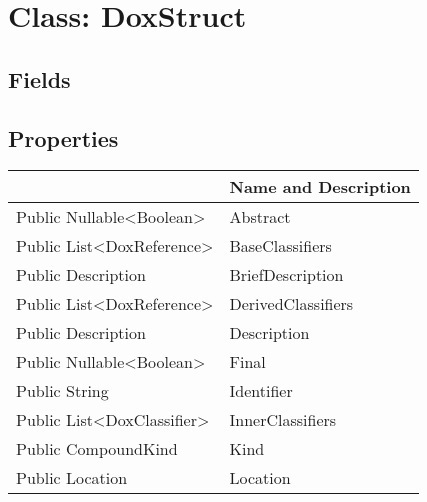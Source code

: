 \documentclass[11pt, oneside, a4paper]{book}
\begin{document}
\hypertarget{SoftwareEngineeringTools.{}Documentation.{}DoxStruct}{}
\section{Class: DoxStruct}

\subsection{Fields}

\subsection{Properties}
\begin{center}
\begin{tabular}{| p{3cm} | p{12cm} | }
\hline
\textbf{ } & \textbf{ Name and Description}\\
\hline
 Public  Nullable<Boolean> &  Abstract\hypertarget{SoftwareEngineeringTools.{}Documentation.{}DoxStruct.{}Abstract}{}\\
\hline
 Public  List<DoxReference> &  BaseClassifiers\hypertarget{SoftwareEngineeringTools.{}Documentation.{}DoxStruct.{}BaseClassifiers}{}\\
\hline
 Public  Description &  BriefDescription\hypertarget{SoftwareEngineeringTools.{}Documentation.{}DoxStruct.{}BriefDescription}{}\\
\hline
 Public  List<DoxReference> &  DerivedClassifiers\hypertarget{SoftwareEngineeringTools.{}Documentation.{}DoxStruct.{}DerivedClassifiers}{}\\
\hline
 Public  Description &  Description\hypertarget{SoftwareEngineeringTools.{}Documentation.{}DoxStruct.{}Description}{}\\
\hline
 Public  Nullable<Boolean> &  Final\hypertarget{SoftwareEngineeringTools.{}Documentation.{}DoxStruct.{}Final}{}\\
\hline
 Public  String &  Identifier\hypertarget{SoftwareEngineeringTools.{}Documentation.{}DoxStruct.{}Identifier}{}\\
\hline
 Public  List<DoxClassifier> &  InnerClassifiers\hypertarget{SoftwareEngineeringTools.{}Documentation.{}DoxStruct.{}InnerClassifiers}{}\\
\hline
 Public  CompoundKind &  Kind\hypertarget{SoftwareEngineeringTools.{}Documentation.{}DoxStruct.{}Kind}{}\\
\hline
 Public  Location &  Location\hypertarget{SoftwareEngineeringTools.{}Documentation.{}DoxStruct.{}Location}{}\\

\end{tabular}
\end{center}
\end{document}
